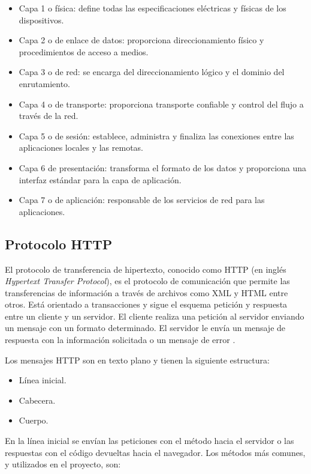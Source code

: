 \begin{itemize}
	\item Capa 1 o física: define todas las especificaciones eléctricas y físicas de los dispositivos.
	\item Capa 2 o de enlace de datos: proporciona direccionamiento físico y procedimientos de acceso a medios.
	\item Capa 3 o de red: se encarga del direccionamiento lógico y el dominio del enrutamiento.
	\item Capa 4 o de transporte: proporciona transporte confiable y control del flujo a través de la red.
	\item Capa 5 o de sesión: establece, administra y finaliza las conexiones entre las aplicaciones locales y las remotas.
	\item Capa 6 de presentación: transforma el formato de los datos y proporciona una interfaz estándar para la capa de aplicación.
	\item Capa 7 o de aplicación: responsable de los servicios de red para las aplicaciones.
\end{itemize}

\subsection{Protocolo HTTP}

El protocolo de transferencia de hipertexto, conocido como HTTP (en inglés \textit{Hypertext Transfer Protocol}), es el protocolo de comunicación que permite las transferencias de información a través de archivos como XML y HTML entre otros. Está orientado a transacciones y sigue el esquema petición y respuesta entre un cliente y un servidor. El cliente realiza una petición al servidor enviando un mensaje con un formato determinado. El servidor le envía un mensaje de respuesta con la información solicitada o un mensaje de error \citep{9}.

Los mensajes HTTP son en texto plano y tienen la siguiente estructura:

\begin{itemize}
	\item Línea inicial.
	\item Cabecera.
	\item Cuerpo.
\end{itemize}

En la línea inicial se envían las peticiones con el método hacia el servidor o las respuestas con el código devueltas hacia el navegador. Los métodos más comunes, y utilizados en el proyecto, son:

